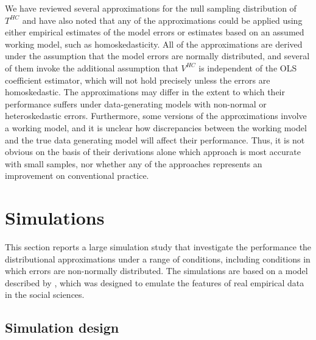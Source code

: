 \documentclass[12pt]{article}\usepackage[]{graphicx}\usepackage[]{color}
\begin{document}
We have reviewed several approximations for the null sampling distribution of $T^{HC}$ and have also noted that any of the approximations could be applied using either empirical estimates of the model errors or estimates based on an assumed working model, such as homoskedasticity.
All of the approximations are derived under the assumption that the model errors are normally distributed, and several of them invoke the additional assumption that $V^{HC}$ is independent of the OLS coefficient estimator, which will not hold precisely unless the errors are homoskedastic. 
The approximations may differ in the extent to which their performance suffers under data-generating models with non-normal or heteroskedastic errors.
Furthermore, some versions of the approximations involve a working model, and it is unclear how discrepancies between the working model and the true data generating model will affect their performance. 
Thus, it is not obvious on the basis of their derivations alone which approach is most accurate with small samples, nor whether any of the approaches represents an improvement on conventional practice.

\section{Simulations}
\label{sec:simulations}

This section reports a large simulation study that investigate the performance the distributional approximations under a range of conditions, including conditions in which errors are non-normally distributed. The simulations are based on a model described by \citet{Long2000using}, which was designed to emulate the features of real empirical data in the social sciences.

\subsection{Simulation design}
\end{document}
